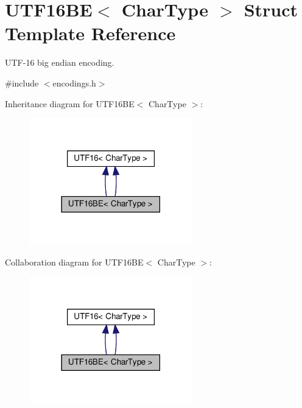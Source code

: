 \hypertarget{structUTF16BE}{}\section{U\+T\+F16\+BE$<$ Char\+Type $>$ Struct Template Reference}
\label{structUTF16BE}


U\+T\+F-\/16 big endian encoding.  




{\ttfamily \#include $<$encodings.\+h$>$}



Inheritance diagram for U\+T\+F16\+BE$<$ Char\+Type $>$\+:
\nopagebreak
\begin{figure}[H]
\begin{center}
\leavevmode
\includegraphics[width=201pt]{structUTF16BE__inherit__graph}
\end{center}
\end{figure}


Collaboration diagram for U\+T\+F16\+BE$<$ Char\+Type $>$\+:
\nopagebreak
\begin{figure}[H]
\begin{center}
\leavevmode
\includegraphics[width=201pt]{structUTF16BE__coll__graph}
\end{center}
\end{figure}
